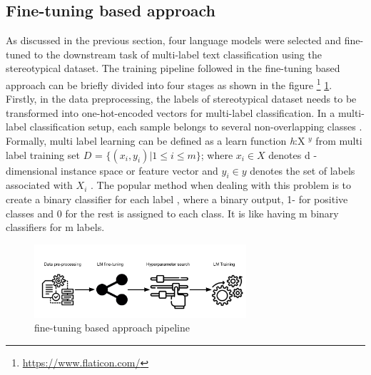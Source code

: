 \subsection{Fine-tuning based approach}
As discussed in the previous section, four language models were selected and fine-tuned to the downstream task of multi-label text classification using the stereotypical dataset. The training pipeline followed in the fine-tuning based approach can be briefly divided into four stages as shown in the figure \footnote{\url{https://www.flaticon.com/}} \ref{fig:fine-tuning based approach}. Firstly, in the data preprocessing, the labels of stereotypical dataset needs to be transformed into one-hot-encoded vectors for multi-label classification. In a multi-label classification setup, each sample belongs to several non-overlapping classes \cite{sokolova2009systematic}. Formally, multi label learning can be defined as a learn function \textit{h}:X $^y$ from multi label training set $D$ = $\{(x_i,y_i)| 1 \leq i\leq m\}$; where  $x_i \in X$ denotes d - dimensional instance space or feature vector and $y_i \in y$ denotes the  set of labels associated with $X_i$ \cite{zhang2013review}. The popular method when dealing with this problem is to create a binary classifier for each label \cite{ji2008extracting}, where a binary output, 1- for positive classes and 0 for the rest is assigned to each class. 
It is like having m binary classifiers for m labels. 
\pagebreak

\begin{figure}[]
    \centering
    \includegraphics[width=0.7\textwidth]{thesis/figures/pipeline_changed.png}
    \caption{fine-tuning based approach pipeline}
    \label{fig:fine-tuning based approach}
\end{figure}

